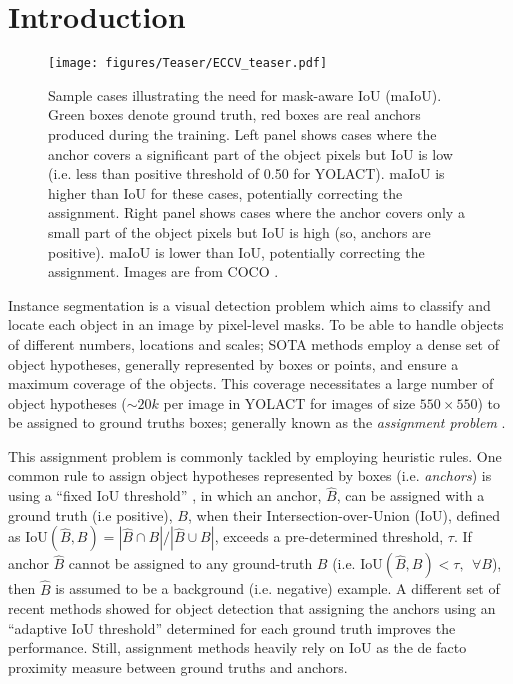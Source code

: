 \documentclass{bmvc2k}
\begin{document}
\section{Introduction}
\label{sec:Introduction}
\begin{figure}
    \centerline{
        \texttt{[image: figures/Teaser/ECCV\_teaser.pdf]}
    }
    \caption{Sample cases illustrating the need for mask-aware IoU (maIoU). Green boxes denote ground truth, red boxes are real anchors produced during the training. Left panel shows cases where the anchor covers a significant part of the object pixels but IoU is low (i.e. less than positive threshold of 0.50 for YOLACT). maIoU is higher than IoU for these cases, potentially correcting the assignment. Right panel shows cases where the anchor covers only a small part of the object pixels but IoU is high (so, anchors are positive). maIoU is lower than IoU, potentially correcting the assignment. Images are from COCO \cite{COCO}.\label{fig:Teaser}
} 
\end{figure}Instance segmentation is a visual detection problem which aims to classify and locate each object in an image by pixel-level masks. To be able to handle objects of different numbers, locations and scales; SOTA methods \cite{yolact,MaskRCNN,solov2} employ a dense set of object hypotheses, generally represented by boxes or points, and ensure a maximum coverage of the objects. This coverage necessitates a large number of object hypotheses ($\sim 20k$ per image in YOLACT \cite{yolact} for images of size $550 \times 550$) to be assigned to  ground truths boxes;  generally known as the \textit{assignment problem} \cite{ATSS,paa}.


This assignment problem is commonly tackled by employing heuristic rules. One common rule to assign object hypotheses represented by boxes (i.e. \textit{anchors}) is using a ``fixed IoU threshold''  \cite{yolact,MaskRCNN,retinamask}, in which an anchor, $\hat{B}$, can be assigned with a ground truth (i.e positive), $B$, when their Intersection-over-Union (IoU), defined as $\mathrm{IoU}(\hat{B}, B)=|\hat{B} \cap B|/|\hat{B} \cup B|$, exceeds a pre-determined threshold, $\tau$. If anchor $\hat{B}$ cannot be assigned to any ground-truth $B$ (i.e.  $\mathrm{IoU}(\hat{B}, B) < \tau,\;\,\forall B$), then $\hat{B}$ is assumed to be a background (i.e. negative) example. A different set of recent methods showed for object detection \cite{ATSS,paa,noisyanchor} that assigning the anchors using an ``adaptive IoU threshold'' determined for each ground truth improves the performance. Still, assignment methods heavily rely on IoU as the de facto proximity measure between ground truths and anchors.
\end{document}
